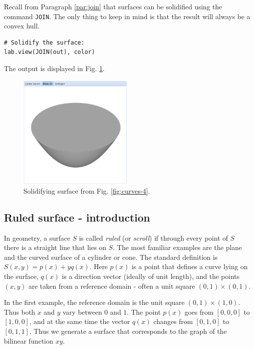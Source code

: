 \documentclass{article}
\begin{document}
Recall from Paragraph \ref{par:join} that surfaces can be solidified
using the command {\tt JOIN}. The only thing to keep in mind is that 
the result will always be a convex hull.  

\begin{verbatim}
# Solidify the surface:
lab.view(JOIN(out), color)
\end{verbatim}
The output is displayed in Fig. \ref{fig:curves-5}.

\begin{figure}[!ht]
\begin{center}
\includegraphics[width=0.5\textwidth]{img/curves-5.png}
\end{center}
\vspace{-2mm}
\caption{Solidifying surface from Fig. \ref{fig:curves-4}.}
\label{fig:curves-5}
\end{figure}


\subsection{Ruled surface - introduction}

In geometry, a surface $S$ is called {\em ruled} (or {\em scroll}) if through every point of $S$ 
there is a straight line that lies on $S$. The most familiar examples are the plane and the curved 
surface of a cylinder or cone. The standard definition is $S(x, y) = p(x) + yq(x)$. Here $p(x)$ is 
a point that defines a curve lying on the surface, $q(x)$ is a direction vector (ideally of unit length), 
and the points $(x, y)$ are taken from a reference domain - often a unit square $(0, 1)\times (0, 1)$.

In the first example, the reference domain is the unit square 
$(0, 1)\times (1, 0)$. Thus both $x$ and $y$ vary between $0$ and $1$. 
The point $p(x)$ goes from $[0, 0, 0]$ to $[1, 0, 0]$, and at 
the same time the vector $q(x)$ changes from $[0, 1, 0]$
to $[0, 1, 1]$. Thus we generate a surface that corresponds
to the graph of the bilinear function $xy$.
\end{document}
